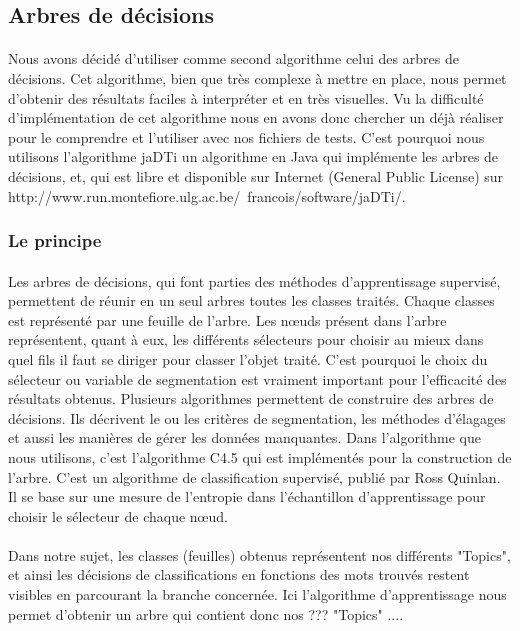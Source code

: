 \subsection{Arbres de décisions}

\paragraph{}
Nous avons décidé d'utiliser comme second algorithme celui des arbres de décisions. Cet algorithme, bien que très complexe à mettre en place, nous permet d'obtenir des résultats faciles à interpréter et en très visuelles.
Vu la difficulté d'implémentation de cet algorithme nous en avons donc chercher un déjà réaliser pour le comprendre et l'utiliser avec nos fichiers de tests. C'est pourquoi nous utilisons l'algorithme jaDTi un algorithme en Java qui implémente les arbres de décisions, et, qui est libre et disponible sur Internet (General Public License) sur http://www.run.montefiore.ulg.ac.be/~francois/software/jaDTi/.


\subsubsection{Le principe}

\paragraph{}
Les arbres de décisions, qui font parties des méthodes d'apprentissage supervisé,  permettent  de réunir en un seul arbres toutes les classes traités. Chaque classes est représenté par une feuille de l'arbre. Les nœuds présent dans l'arbre représentent, quant à eux, les différents sélecteurs pour choisir au mieux dans quel fils il faut se diriger pour classer l'objet traité. C'est pourquoi le choix du sélecteur ou variable de segmentation est vraiment important pour l'efficacité des résultats obtenus.  
Plusieurs algorithmes permettent de construire des arbres de décisions. Ils  décrivent le ou les critères de segmentation, les méthodes d'élagages et aussi  les manières de gérer les données manquantes.
Dans l'algorithme que nous utilisons, c'est l'algorithme C4.5 qui est implémentés pour la construction de l'arbre. C'est un algorithme de classification supervisé, publié par Ross Quinlan. Il se base sur une mesure de l'entropie dans l'échantillon d'apprentissage pour choisir le sélecteur de chaque nœud.

\paragraph{}
Dans notre sujet,  les classes (feuilles) obtenus représentent nos différents "Topics",  et ainsi  les décisions de classifications en fonctions des mots trouvés restent visibles en parcourant la branche concernée.
Ici l'algorithme d'apprentissage nous permet d'obtenir un arbre qui contient donc nos ??? "Topics" ....


